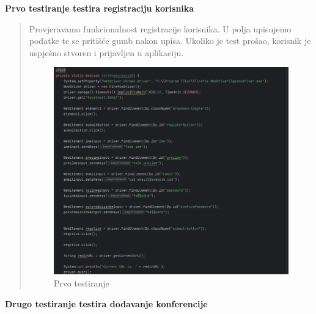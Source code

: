 			
			\begin{packed_enum}
				\item\textbf{Prvo testiranje testira registraciju korisnika}
				
				\begin{quote}
					Provjeravamo funkcionalnost registracije korisnika. U polja upisujemo podatke te se pritišće gumb nakon upisa. Ukoliko je test prošao, korisnik je uspješno stvoren i prijavljen u aplikaciju.
					\begin{figure}[H]
						\includegraphics[width=\textwidth]{slike/Selenium1.png} %
						\caption{Prvo testiranje}
						\label{fig:Selenium1} %
					\end{figure}
				\end{quote}
				
				
				\item\textbf{Drugo testiranje testira dodavanje konferencije}
				

\end{packed_enum}

